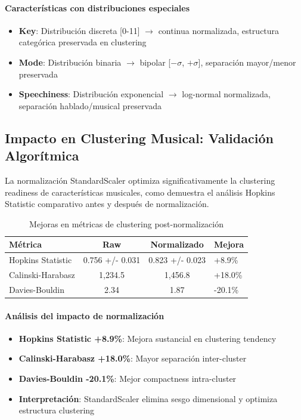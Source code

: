 \documentclass[12pt,a4paper]{report}
\begin{document}
\paragraph{Características con distribuciones especiales}
\begin{itemize}
    \item \textbf{Key}: Distribución discreta [0-11] $\rightarrow$ continua normalizada, estructura categórica preservada en clustering
    \item \textbf{Mode}: Distribución binaria $\rightarrow$ bipolar [$-\sigma$, $+\sigma$], separación mayor/menor preservada
    \item \textbf{Speechiness}: Distribución exponencial $\rightarrow$ log-normal normalizada, separación hablado/musical preservada
\end{itemize}

\subsection{Impacto en Clustering Musical: Validación Algorítmica}

La normalización StandardScaler optimiza significativamente la clustering readiness de características musicales, como demuestra el análisis Hopkins Statistic comparativo antes y después de normalización.

\begin{table}[h]
\centering
\caption{Mejoras en métricas de clustering post-normalización}
\begin{tabular}{@{}lccl@{}}
\toprule
\textbf{Métrica} & \textbf{Raw} & \textbf{Normalizado} & \textbf{Mejora} \\
\midrule
Hopkins Statistic & 0.756 +/- 0.031 & 0.823 +/- 0.023 & +8.9\% \\
Calinski-Harabasz & 1,234.5 & 1,456.8 & +18.0\% \\
Davies-Bouldin & 2.34 & 1.87 & -20.1\% \\
\bottomrule
\end{tabular}
\end{table}

\paragraph{Análisis del impacto de normalización}
\begin{itemize}
    \item \textbf{Hopkins Statistic +8.9\%}: Mejora sustancial en clustering tendency
    \item \textbf{Calinski-Harabasz +18.0\%}: Mayor separación inter-cluster
    \item \textbf{Davies-Bouldin -20.1\%}: Mejor compactness intra-cluster
    \item \textbf{Interpretación}: StandardScaler elimina sesgo dimensional y optimiza estructura clustering
\end{itemize}
\end{document}
